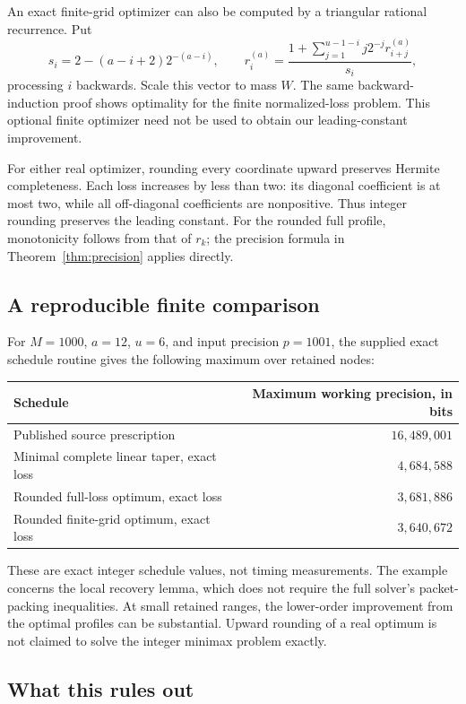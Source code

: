 \documentclass[11pt,letterpaper]{article}
\numberwithin{equation}{section}
\theoremstyle{definition}
\theoremstyle{remark}
\begin{document}
An exact finite-grid optimizer can also be computed by a triangular
rational recurrence. Put
\[
 s_i=2-(a-i+2)2^{-(a-i)},\qquad
 r_i^{(a)}=\frac{1+\sum_{j=1}^{u-1-i}j2^{-j}r_{i+j}^{(a)}}{s_i},
\]
processing $i$ backwards. Scale this vector to mass $W$.
The same backward-induction proof shows optimality for the finite
normalized-loss problem. This optional finite optimizer need not be used
to obtain our leading-constant improvement.

For either real optimizer, rounding every coordinate upward preserves
Hermite completeness. Each loss increases by less than two: its diagonal
coefficient is at most two, while all off-diagonal coefficients are
nonpositive. Thus integer rounding preserves the leading constant.
For the rounded full profile, monotonicity follows from that of $r_k$;
the precision formula in Theorem~\ref{thm:precision} applies directly.

\subsection{A reproducible finite comparison}

For $M=1000$, $a=12$, $u=6$, and input precision $p=1001$, the supplied
exact schedule routine gives the following maximum over retained nodes:
\begin{center}
\begin{tabular}{@{}lr@{}}
\toprule
Schedule & Maximum working precision, in bits \\
\midrule
Published source prescription & $16{,}489{,}001$ \\
Minimal complete linear taper, exact loss & $4{,}684{,}588$ \\
Rounded full-loss optimum, exact loss & $3{,}681{,}886$ \\
Rounded finite-grid optimum, exact loss & $3{,}640{,}672$ \\
\bottomrule
\end{tabular}
\end{center}
These are exact integer schedule values, not timing measurements. The
example concerns the local recovery lemma, which does not require the
full solver's packet-packing inequalities. At small retained ranges, the
lower-order improvement from the optimal
profiles can be substantial. Upward rounding of a real optimum is not
claimed to solve the integer minimax problem exactly.

\subsection{What this rules out}
\end{document}
